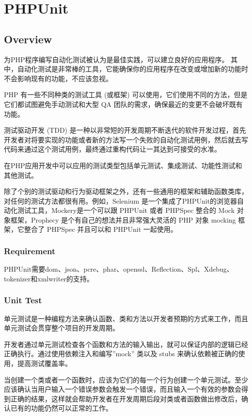 \part{PHPUnit}


\chapter{Overview}

为PHP程序编写自动化测试被认为是最佳实践，可以建立良好的应用程序。 其中，自动化测试是非常棒的工具，它能确保你的应用程序在改变或增加新的功能时不会影响现有的功能，不应该忽视。


PHP 有一些不同种类的测试工具 (或框架) 可以使用，它们使用不同的方法，但是它们都试图避免手动测试和大型 QA 团队的需求，确保最近的变更不会破坏既有功能。

测试驱动开发 (TDD) 是一种以非常短的开发周期不断迭代的软件开发过程，首先开发者对将要实现的功能或者新的方法写一个失败的自动化测试用例，然后就去写代码来通过这个测试用例，最终通过重构代码让一其达到可接受的水准。

在PHP应用开发中可以应用的测试类型包括单元测试、集成测试、功能性测试和其他测试。

除了个别的测试驱动和行为驱动框架之外，还有一些通用的框架和辅助函数类库，对任何的测试方法都很有用。例如，Selenium 是一个集成了PHPUnit的浏览器自动化测试工具，Mockery是一个可以跟 PHPUnit 或者 PHPSpec 整合的 Mock 对象框架，Prophecy 是个有自己的想法并且非常强大灵活的 PHP 对象 mocking 框架，它整合了 PHPSpec 并且可以和 PHPUnit 一起使用。


\section{Requirement}

PHPUnit需要dom、json、pcre、phar、openssl、Reflection、Spl、Xdebug、tokenizer和xmlwriter的支持。




\section{Unit Test}


单元测试是一种编程方法来确认函数、类和方法以开发者预期的方式来工作，而且单元测试会贯穿整个项目的开发周期。

开发者通过单元测试检查各个函数和方法的输入输出，就可以保证内部的逻辑已经正确执行。通过使用依赖注入和编写”mock” 类以及 stubs 来确认依赖被正确的使用，提高测试覆盖率。

当创建一个类或者一个函数时，应该为它们的每一个行为创建一个单元测试。至少应该确认当用户输入一个错误参数会触发一个错误，而且输入一个有效的参数会得到正确的结果，这样就会帮助开发者在开发周期后段对类或者函数做出修改后，确认已有的功能仍然可以正常的工作。

